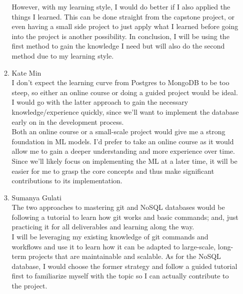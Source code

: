 \documentclass[12pt]{article}
\begin{document}
\begin{enumerate}
\begin{enumerate}
    However, with my learning style, I would do better if I also applied the things I learned. This can be done straight from the capstone project, or even having a small side project to just apply
    what I learned before going into the project is another possibility. In conclusion, I will be using the first method to gain the knowledge I need but will also do the second method due to my learning style.
    \newline
    \item Kate Min\\
    I don't expect the learning curve from Postgres to MongoDB to be too steep, so either an online course or doing a guided project would be ideal. I would go with the latter approach to gain the necessary
    knowledge/experience quickly, since we'll want to implement the database early on in the development process.\\
    
    Both an online course or a small-scale project would give me a strong foundation in ML models. I'd prefer to take an online course as it would allow me to gain a deeper understanding and more experience
    over time. Since we'll likely focus on implementing the ML at a later time, it will be easier for me to grasp the core concepts and thus make significant contributions to its implementation.
    \newline
    \item Sumanya Gulati\\
    The two approaches to mastering git and NoSQL databases would be following a tutorial to learn how git works and basic commands; and, just practicing it for all deliverables and learning along the way.\\
    
    I will be leveraging my existing knowledge of git commands and workflows and use it to learn how it can be adapted to large-scale, long-term projects that are maintainable and scalable. As for the NoSQL database,
    I would choose the former strategy and follow a guided tutorial first to familiarize myself with the topic so I can actually contribute to the project.
  \end{enumerate}
\end{enumerate}
\end{document}
